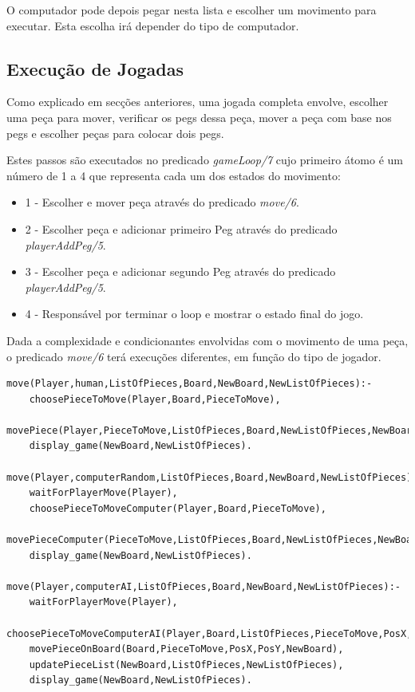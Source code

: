 \documentclass[paper=a4, fontsize=11pt]{scrartcl} %
\numberwithin{equation}{section} %
\numberwithin{figure}{section} %
\numberwithin{table}{section} %
\begin{document}
O computador pode depois pegar nesta lista e escolher um movimento para executar. Esta escolha irá depender do tipo de computador.

\subsection{Execução de Jogadas}

Como explicado em secções anteriores, uma jogada completa envolve, escolher uma peça para mover, verificar os pegs dessa peça, mover a peça com base nos pegs e escolher peças para colocar dois pegs.

Estes passos são executados no predicado \textit{gameLoop/7} cujo primeiro átomo é um número de 1 a 4 que representa cada um dos estados do movimento:
\begin{itemize}
	\item 1 -  Escolher e mover peça através do predicado \textit{move/6}.
	\item 2 - Escolher peça e adicionar primeiro Peg através do predicado  \textit{playerAddPeg/5}.
	\item 3 - Escolher peça e adicionar segundo Peg através do predicado  \textit{playerAddPeg/5}.
	\item 4 - Responsável por terminar o loop e mostrar o estado final do jogo.
\end{itemize}

Dada a complexidade e condicionantes envolvidas com o movimento de uma peça, o predicado \textit{move/6} terá execuções diferentes, em função do tipo de jogador.

\begin{lstlisting}
move(Player,human,ListOfPieces,Board,NewBoard,NewListOfPieces):-
	choosePieceToMove(Player,Board,PieceToMove),
	movePiece(Player,PieceToMove,ListOfPieces,Board,NewListOfPieces,NewBoard),
	display_game(NewBoard,NewListOfPieces).

move(Player,computerRandom,ListOfPieces,Board,NewBoard,NewListOfPieces):-
	waitForPlayerMove(Player),
	choosePieceToMoveComputer(Player,Board,PieceToMove),
	movePieceComputer(PieceToMove,ListOfPieces,Board,NewListOfPieces,NewBoard),
	display_game(NewBoard,NewListOfPieces).

move(Player,computerAI,ListOfPieces,Board,NewBoard,NewListOfPieces):-
	waitForPlayerMove(Player),
	choosePieceToMoveComputerAI(Player,Board,ListOfPieces,PieceToMove,PosX,PosY),
	movePieceOnBoard(Board,PieceToMove,PosX,PosY,NewBoard),
	updatePieceList(NewBoard,ListOfPieces,NewListOfPieces),
	display_game(NewBoard,NewListOfPieces).
\end{lstlisting}
\end{document}
